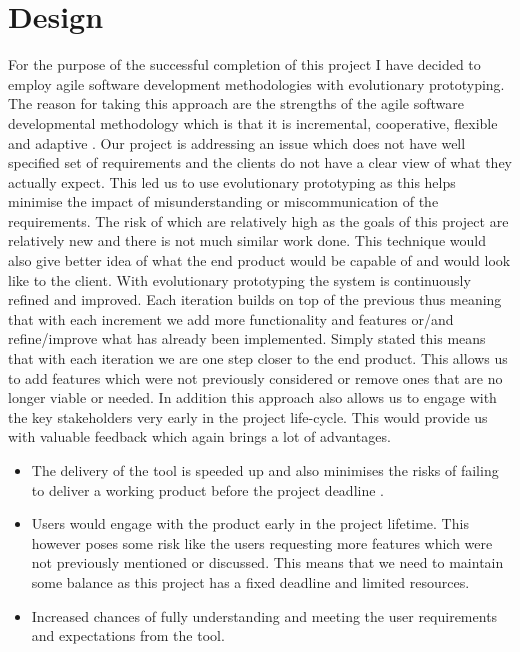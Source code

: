 \chapter{Design}
For the purpose of the successful completion of this project I have decided to employ agile software development methodologies with evolutionary prototyping. The reason for taking this approach are the strengths of the agile software developmental methodology which is that it is incremental, cooperative, flexible and adaptive \cite{4147390}. Our project is addressing an issue which does not have well specified set of requirements and the clients do not have a clear view of what they actually expect. This led us to use  evolutionary prototyping \cite{Connell89} as this helps minimise the impact of misunderstanding or miscommunication of the requirements. The risk of which are relatively high as the goals of this project are relatively new and there is not much similar work done. This technique would also give better idea of what the end product would be capable of and would look like to the client. With evolutionary prototyping the system is continuously refined and improved. Each iteration builds on top of the previous thus meaning that with each increment we add more functionality and features or/and refine/improve what has already been implemented. Simply stated this means that with each iteration we are one step closer to the end product. This allows us to add features which were not previously considered or remove ones that are no longer viable or needed. In addition this approach also allows us to engage with the key stakeholders very early in the project life-cycle. This would provide us with valuable feedback which again brings a lot of advantages.

\begin{itemize}
	\item The delivery of the tool is speeded up and also minimises the risks of failing to deliver a working product before the project deadline \cite{Connell89}.
	\item Users would engage with the product early in the project lifetime. This however poses some risk like the users requesting more features which were not previously mentioned or discussed. This means that we need to maintain some balance as this project has a fixed deadline and limited resources.
	\item Increased chances of fully understanding and meeting the user requirements and expectations from the tool.
\end{itemize}

